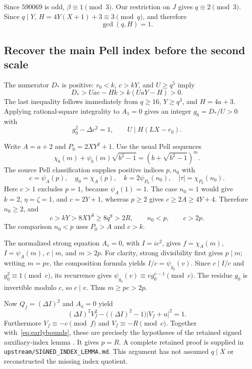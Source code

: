 \documentclass[11pt]{article}
\theoremstyle{remark}
\begin{document}
Since $590069$ is odd, $\beta\equiv1\pmod3$. Our restriction on $J$
gives $q\equiv2\pmod3$. Since $q\mid Y$,
$H=4Y(X+1)+3\equiv3\pmod q$, and therefore
\begin{equation}
 \gcd(q,H)=1.\label{eq:qH}
\end{equation}

\subsection{Recover the main Pell index before the second scale}

The numerator $D_*$ is positive: $r_0<k$, $c>kY$, and $U\ge q^5$ imply
\[
 D_*>Uac-Hk>k(UaY-H)>0.
\]
The last inequality follows immediately from $q\ge16$, $Y\ge q^3$,
and $H=4a+3$. Applying rational-square integrality to $A_1=0$ gives
an integer $g_0=D_*/U>0$ with
\begin{equation}
 g_0^2-\Delta c^2=1,\qquad U\mid H(LX-r_0).
 \label{eq:adaptivecongruence}
\end{equation}

Write $A=a+2$ and $P_0=2XY^2+1$. Use the usual Pell sequences
\[
 \chi_b(m)+\psi_b(m)\sqrt{b^2-1}
       =(b+\sqrt{b^2-1})^m.
\]
The source Pell classification supplies positive indices $p,n_0$ with
\[
 c=\psi_A(p),\quad g_0=\chi_A(p),\quad
 k=2\psi_{P_0}(n_0),\quad |\tau|=\chi_{P_0}(n_0).
\]
Here $c>1$ excludes $p=1$, because $\psi_A(1)=1$.
The case $n_0=1$ would give $k=2$, $\eta=\zeta=1$, and $c=2Y+1$,
whereas $p\ge2$ gives $c\ge2A\ge4Y+4$. Therefore $n_0\ge2$, and
\begin{equation}
 c>kY>8XY^3\ge8q^9>2R,\qquad n_0<p,\qquad c>2p.
 \label{eq:earlybounds}
\end{equation}
The comparison $n_0<p$ uses $P_0>A$ and $c>k$.

The normalized strong equation $A_s=0$, with $I=ic^2$, gives
$f=\chi_A(m)$, $I=\psi_A(m)$, $c\mid m$, and $m>2p$.
For clarity, strong divisibility first gives $p\mid m$; writing $m=pv$,
the composition formula yields $I/c=\psi_{g_0}(v)$. Since $c\mid I/c$
and $g_0^2\equiv1\pmod c$, its recurrence gives
$\psi_{g_0}(v)\equiv v g_0^{v-1}\pmod c$.
The residue $g_0$ is invertible modulo $c$, so $c\mid v$.
Thus $m\ge pc>2p$.

Now $Q_f=(\Delta I)^2$ and $A_a=0$ yield
\[
 (\Delta I)^2V_f^2-\bigl((\Delta I)^2-1\bigr)|V_f+u|^2=1.
\]
Furthermore $V_f\equiv-c\pmod f$ and $V_f\equiv-R\pmod c$.
Together with~\eqref{eq:earlybounds}, these are precisely the hypotheses
of the retained signed auxiliary-index lemma \cite{source61}. It gives
$p=R$. A complete retained proof is supplied in
\texttt{upstream/SIGNED\_INDEX\_LEMMA.md}. This argument has not assumed
$q\mid X$ or reconstructed the missing index quotient.
\end{document}
